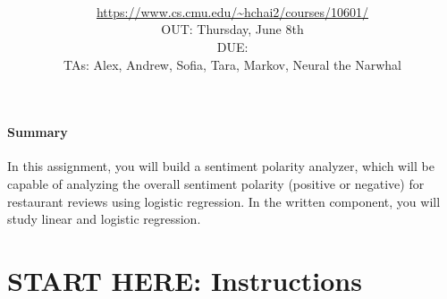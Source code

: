 \documentclass[11pt,addpoints,answers]{exam}
\title{\textsc{\hwName}
} %
\author{\courseName\\
\url{https://www.cs.cmu.edu/~hchai2/courses/10601/} \\
OUT: Thursday, June 8th \\
DUE: \dueDate{} \\ 
TAs: Alex, Andrew, Sofia, Tara, Markov, Neural the Narwhal
}
\date{}
\date{}
\begin{document}
\maketitle

\begin{notebox}
\paragraph{Summary} In this assignment, you will build a sentiment polarity analyzer, which will be capable of analyzing the overall sentiment polarity (positive or negative) for restaurant reviews using logistic regression. In the written component, you will study linear and logistic regression.
\end{notebox}
\section*{START HERE: Instructions}
\end{document}
